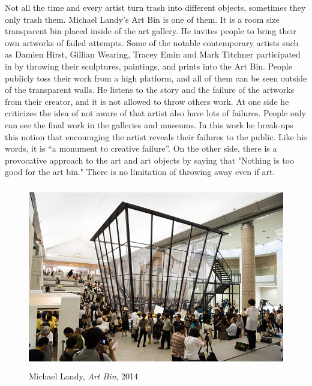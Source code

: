Not all the time and every artist turn trash into different objects, sometimes they only trash them. Michael Landy's Art Bin is one of them. It is a room size transparent bin placed inside of the art gallery. He invites people to bring their own artworks of failed attempts. Some of the notable contemporary artists such as Damien Hirst, Gillian Wearing, Tracey Emin and Mark Titchner participated in by throwing their sculptures, paintings, and prints into the Art Bin. People publicly toss their work from a high platform, and all of them can be seen outside of the transparent walls. He listens to the story and the failure of the artworks from their creator, and it is not allowed to throw others work. At one side he criticizes the idea of not aware of that artist also have lots of failures. People only can see the final work in the galleries and museums. In this work he break-ups this notion that encouraging the artist reveals their failures to the public. Like his words, it is “a monument to creative failure”. On the other side, there is a provocative approach to the art and art objects by saying that "Nothing is too good for the art bin." There is no limitation of throwing away even if art. 

\begin{figure}[h!]
  \centering
  \includegraphics[height=8cm]{graphics/MichaelLandy_ArtBin.jpg}
  \caption{Michael Landy, \textit{Art Bin}, 2014}
  \label{fig:MichaelLandy_ArtBin}
\end{figure}


